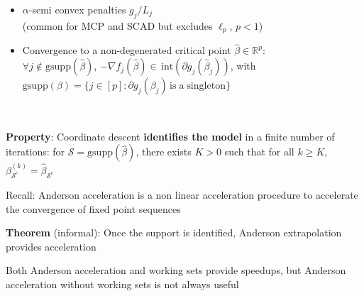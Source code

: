 \documentclass[english,final,t]{beamer}
\newcommand{\bbR}{\mathbb{R}}
\newcommand{\cS}{\mathcal{S}}
\begin{document}
\begin{frame}{}
\begin{columns}[t]
\begin{column}{.3\linewidth}
\begin{block}{\textbf{\color{malgared}{\# 2 Support Identification}}}
\begin{itemize}
			\item
			$\alpha$-semi convex penalties $g_j / L_j$
			\\
			(common for MCP and SCAD but excludes $\ell_p$, $p<1$)
			\item
			Convergence to a non-degenerated critical point $\hat \beta \in \bbR^p$:\\
			 $\forall j \notin \mathrm{gsupp}(\hat \beta)$,
			$- \nabla f_j (\hat \beta) \in \, \mathrm{int}(\partial g_j(\hat \beta_j))$, with
			$\mathrm{gsupp}(\beta) = \{j \in [p]: \partial g_j(\beta_j) \, \mathrm{is \; a \; singleton}\}$
		\end{itemize}

		 \vspace{0.5em}

		\textbf{\color{malgared}Property}:  Coordinate descent \textbf{identifies the model} in a finite number of iterations: for $\cS = \mathrm{gsupp}(\hat \beta)$, there exists $K>0$ such that for all $k\geq K$, $\beta_{\cS^c}^{(k)} = \hat \beta_{\cS^c}$
		\end{block}
	\begin{block}{\textbf{\color{malgared}{\# 3 Anderson Acceleration}}}

		{\color{malgared}Recall}: Anderson acceleration is a non linear acceleration procedure to accelerate the convergence of fixed point sequences

		\textbf{\color{malgared}Theorem} (informal): Once the support is identified, Anderson extrapolation provides acceleration

		\begin{center}
		\end{center}

		Both Anderson acceleration and working sets provide speedups, but
		Anderson acceleration without working sets is not always useful


\end{block}
\end{column}
\end{columns}
\end{frame}
\end{document}
